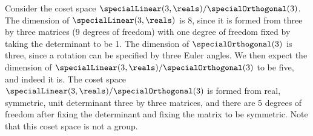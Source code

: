 \documentclass[fleqn]{NotesClass}
\begin{document}
    \begin{exm}{}{}
        Consider the coset space \(\specialLinear(3, \reals) / \specialOrthogonal(3)\).
        The dimension of \(\specialLinear(3, \reals)\) is 8, since it is formed from three by three matrices (9 degrees of freedom) with one degree of freedom fixed by taking the determinant to be 1.
        The dimension of \(\specialOrthogonal(3)\) is three, since a rotation can be specified by three Euler angles.
        We then expect the dimension of \(\specialLinear(3, \reals) / \specialOrthogonal(3)\) to be five, and indeed it is.
        The coset space \(\specialLinear(3, \reals)/\specialOrthogonal(3)\) is formed from real, symmetric, unit determinant three by three matrices, and there are 5 degrees of freedom after fixing the determinant and fixing the matrix to be symmetric.
        Note that this coset space is not a group.
        

\end{exm}
\end{document}
